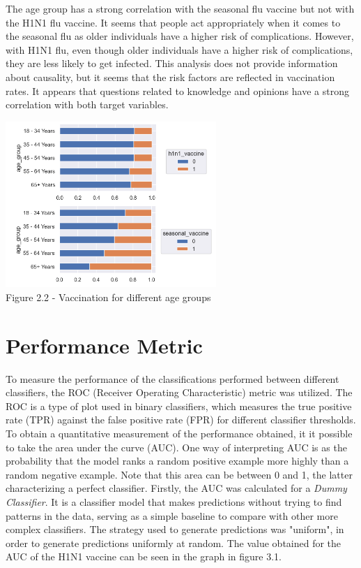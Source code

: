 \documentclass{IEEEtran}
\begin{document}
The age group has a strong correlation with the seasonal flu vaccine but not with the H1N1 flu vaccine. It seems that people act appropriately when it comes to the seasonal flu as older individuals have a higher risk of complications. However, with H1N1 flu, even though older individuals have a higher risk of complications, they are less likely to get infected. This analysis does not provide information about causality, but it seems that the risk factors are reflected in vaccination rates.
It appears that questions related to knowledge and opinions have a strong correlation with both target variables.

\begin{center}
    \includegraphics[width = 8cm]{figures/Age.png}\\
    Figure 2.2 - Vaccination for different age groups
\end{center}

\section{Performance Metric}
To measure the performance of the classifications performed between different classifiers, the ROC (Receiver Operating Characteristic) metric was utilized. The ROC is a type of plot used in binary classifiers, which measures the true positive rate (TPR) against the false positive rate (FPR) for different classifier thresholds. To obtain a quantitative measurement of the performance obtained, it it possible to take the area under the curve (AUC). One way of interpreting AUC is as the probability that the model ranks a random positive example more highly than a random negative example. Note that this area can be between 0 and 1, the latter characterizing a perfect classifier.
Firstly, the AUC was calculated for a \textit{Dummy Classifier}. It is a classifier model that makes predictions without trying to find patterns in the data, serving as a simple baseline to compare with other more complex classifiers. The strategy used to generate predictions was "uniform", in order to generate predictions uniformly at random. The value obtained for the AUC of the H1N1 vaccine can be seen in the graph in figure 3.1.
\end{document}
